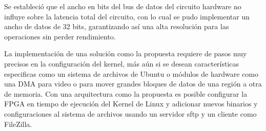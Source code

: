 Se estableció que el ancho en bits del bus de datos del circuito hardware no influye sobre la latencia total del circuito, con lo cual se pudo implementar un ancho de datos de 32 bits, garantizando así una alta resolución para las operaciones sin perder rendimiento.

La implementación de una solución como la propuesta requiere de pasos muy precisos en la configuración del kernel, más aún si se desean características especificas como un sistema de archivos de Ubuntu o módulos de hardware como una DMA para video o para mover grandes bloques de datos de una región a otra de memoria. Con una arquitectura como la propuesta es posible configurar la FPGA en tiempo de ejecución del Kernel de Linux y adicionar nuevos binarios y configuraciones al sistema de archivos usando un servidor sftp y un cliente como FileZilla.
